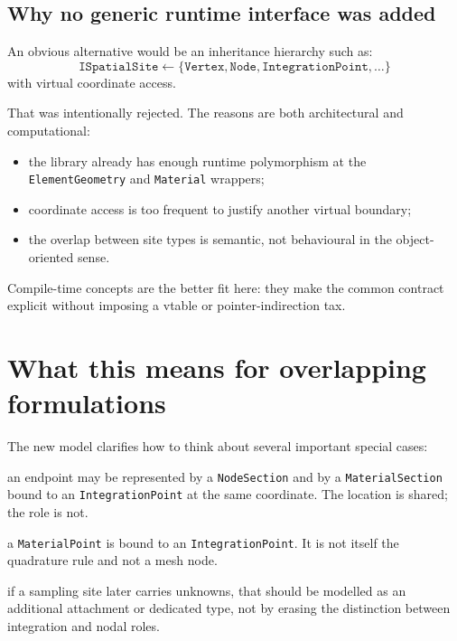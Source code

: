 \subsection{Why no generic runtime interface was added}

An obvious alternative would be an inheritance hierarchy such as:
\[
  \texttt{ISpatialSite} \leftarrow
  \{\texttt{Vertex}, \texttt{Node}, \texttt{IntegrationPoint}, \dots\}
\]
with virtual coordinate access.

That was intentionally rejected.  The reasons are both architectural and
computational:
\begin{itemize}[nosep]
  \item the library already has enough runtime polymorphism at the
        \texttt{ElementGeometry} and \texttt{Material} wrappers;
  \item coordinate access is too frequent to justify another virtual boundary;
  \item the overlap between site types is semantic, not behavioural in the
        object-oriented sense.
\end{itemize}

Compile-time concepts are the better fit here: they make the common contract
explicit without imposing a vtable or pointer-indirection tax.

\section{What this means for overlapping formulations}

The new model clarifies how to think about several important special cases:
\begin{description}[nosep]
  \item[Gauss--Lobatto beam integration] an endpoint may be represented by a
        \texttt{NodeSection} and by a \texttt{MaterialSection} bound to an
        \texttt{IntegrationPoint} at the same coordinate.  The location is
        shared; the role is not.
  \item[Continuum material points] a \texttt{MaterialPoint} is bound to an
        \texttt{IntegrationPoint}.  It is not itself the quadrature rule and
        not a mesh node.
  \item[Mixed or assumed-strain formulations] if a sampling site later carries
        unknowns, that should be modelled as an additional attachment or
        dedicated type, not by erasing the distinction between integration and
        nodal roles.
\end{description}

